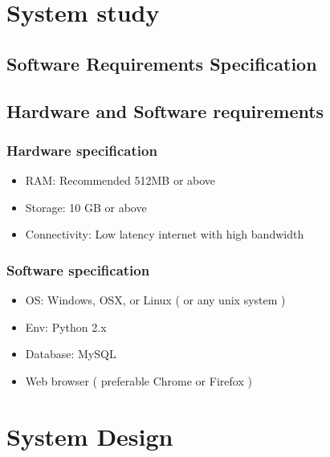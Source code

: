 \documentclass{article}
\begin{document}
\newpage

\section{System study}
\vspace{1em}

\subsection{Software Requirements Specification}
\vspace{1em}
\subsection{Hardware and Software requirements}
\vspace{1em}
\subsubsection{Hardware specification}
\vspace{1em}
\begin{itemize}
\item RAM: Recommended 512MB or above
\item Storage: 10 GB or above
\item Connectivity: Low latency internet with high bandwidth
\end{itemize}
\subsubsection{Software specification}
\begin{itemize}
\item OS: Windows, OSX, or Linux ( or any unix system )
\item Env: Python 2.x
\item Database: MySQL
\item Web browser ( preferable Chrome or Firefox )
\end{itemize}
\vspace{1em}

\vspace{1em}

\newpage

\section{System Design}
\vspace{1em}
\end{document}
